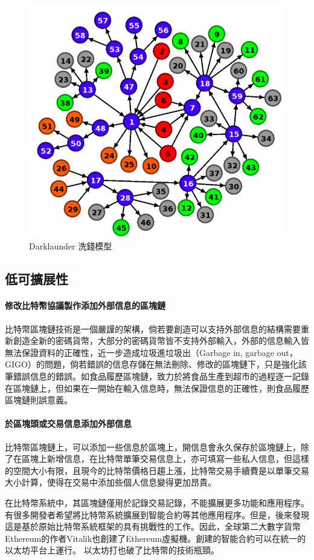 			\begin{figure}[h]
				\centering
				\includegraphics[width = .7\textwidth]{Darklaunderworkflow.png}
				\caption{Darklaunder 洗錢模型\supercite{AnAnalysisofBitcoinLaundryServices}}\label{Darklaunderworkflow}
			\end{figure}

		\subsection{低可擴展性}

			\paragraph{修改比特幣協議製作添加外部信息的區塊鏈}比特幣區塊鏈技術是一個嚴謹的架構，倘若要創造可以支持外部信息的結構需要重新創造全新的密碼貨幣，大部分的密碼貨幣皆不支持外部輸入，外部的信息輸入皆無法保證資料的正確性，近一步造成垃圾進垃圾出（Garbage in, garbage out，GIGO）的問題，倘若錯誤的信息存儲在無法刪除、修改的區塊鏈下，只是強化該筆錯誤信息的錯誤。如食品履歷區塊鏈，致力於將食品生產到超市的過程逐一記錄在區塊鏈上，但如果在一開始在輸入信息時，無法保證信息的正確性，則食品履歷區塊鏈則誤意義。
			\paragraph{於區塊頭或交易信息添加外部信息} 比特幣區塊鏈上，可以添加一些信息於區塊上，開信息會永久保存於區塊鏈上，除了在區塊上新增信息，在比特幣單筆交易信息上，亦可填寫一些私人信息，但這樣的空間大小有限，且現今的比特幣價格日趨上漲，比特幣交易手續費是以單筆交易大小計算，使得在交易中添加些個人信息變得更加昂貴。

		在比特幣系統中，其區塊鏈僅用於記錄交易記錄，不能擴展更多功能和應用程序。有很多開發者希望將比特幣系統擴展到智能合約等其他應用程序。但是，後來發現這是基於原始比特幣系統框架的具有挑戰性的工作。因此，全球第二大數字貨幣Ethereum的作者Vitalik也創建了Ethereum虛擬機。創建的智能合約可以在統一的以太坊平台上運行。 以太坊打也破了比特幣的技術瓶頸。

